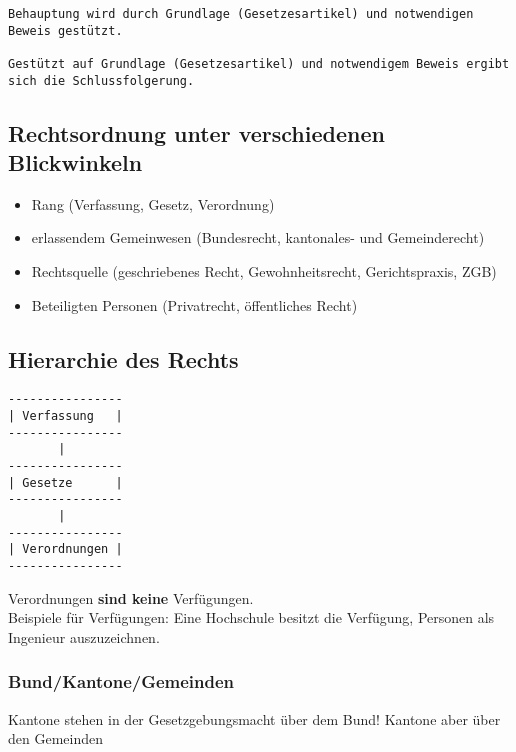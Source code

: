 \begin{verbatim}
Behauptung wird durch Grundlage (Gesetzesartikel) und notwendigen Beweis gestützt. 

Gestützt auf Grundlage (Gesetzesartikel) und notwendigem Beweis ergibt sich die Schlussfolgerung.
\end{verbatim}

\hypertarget{rechtsordnung-unter-verschiedenen-blickwinkeln}{%
\subsection{Rechtsordnung unter verschiedenen
Blickwinkeln}\label{rechtsordnung-unter-verschiedenen-blickwinkeln}}

\begin{itemize}
\tightlist
\item
  Rang (Verfassung, Gesetz, Verordnung)
\item
  erlassendem Gemeinwesen (Bundesrecht, kantonales- und Gemeinderecht)
\item
  Rechtsquelle (geschriebenes Recht, Gewohnheitsrecht, Gerichtspraxis,
  ZGB)
\item
  Beteiligten Personen (Privatrecht, öffentliches Recht)
\end{itemize}

\hypertarget{hierarchie-des-rechts}{%
\subsection{Hierarchie des Rechts}\label{hierarchie-des-rechts}}

\begin{verbatim}
----------------
| Verfassung   |
----------------
       |
----------------
| Gesetze      |
----------------
       |
----------------
| Verordnungen |
----------------
\end{verbatim}

Verordnungen \textbf{sind keine} Verfügungen.\\
Beispiele für Verfügungen: Eine Hochschule besitzt die Verfügung,
Personen als Ingenieur auszuzeichnen.

\hypertarget{bundkantonegemeinden}{%
\subsubsection{Bund/Kantone/Gemeinden}\label{bundkantonegemeinden}}

Kantone stehen in der Gesetzgebungsmacht über dem Bund! Kantone aber
über den Gemeinden

